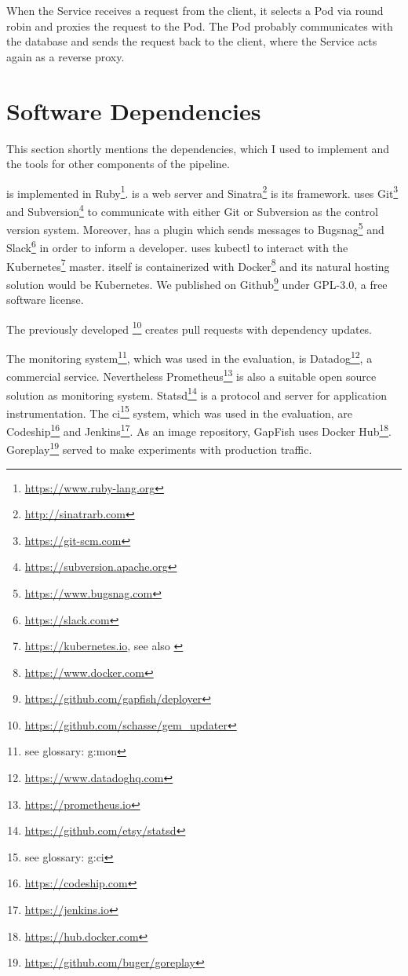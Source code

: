 When the Service receives a request from the client, it selects a Pod via round robin and
proxies the request to the Pod. The Pod probably communicates with the database and sends
the request back to the client, where the Service acts again as a reverse proxy.

\section{Software Dependencies}

This section shortly mentions the dependencies, which I used to implement \deployer{} and the
tools for other components of the pipeline.

\deployer{} is implemented in Ruby\footnote{\url{https://www.ruby-lang.org}}. \deployer{} is a
web server and Sinatra\footnote{\url{http://sinatrarb.com}} is its framework. \deployer{} uses
Git\footnote{\url{https://git-scm.com}} and
Subversion\footnote{\url{https://subversion.apache.org}} to communicate with either Git or
Subversion as the control version system. Moreover, \deployer{} has a plugin which sends
messages to Bugsnag\footnote{\url{https://www.bugsnag.com}} and
Slack\footnote{\url{https://slack.com}} in order to inform a developer. \deployer{} uses kubectl to interact with
the Kubernetes\footnote{\url{https://kubernetes.io}, see also
  \cite{kubernetes_architecture,kubernetes_architecture2}} master. \deployer{} itself is
containerized with Docker\footnote{\url{https://www.docker.com}} and its natural hosting
solution would be Kubernetes. We published \deployer{} on
Github\footnote{\url{https://github.com/gapfish/deployer}} under GPL-3.0, a free software
license.

The previously developed
\gemupdater{}\footnote{\url{https://github.com/schasse/gem_updater}} creates pull requests
with dependency updates.

The monitoring system\footnote{see glossary: \gls{g:mon}}, which was used in the evaluation,
is Datadog\footnote{\url{https://www.datadoghq.com}}, a commercial service. Nevertheless
Prometheus\footnote{\url{https://prometheus.io}} is also a suitable open source solution
as monitoring system. Statsd\footnote{\url{https://github.com/etsy/statsd}} is a protocol and server for application instrumentation. The \gls{ci}\footnote{see glossary: \gls{g:ci}} system, which was used in
the evaluation, are Codeship\footnote{\url{https://codeship.com}} and
Jenkins\footnote{\url{https://jenkins.io}}. As an image repository, GapFish uses Docker
Hub\footnote{\url{https://hub.docker.com}}. Goreplay\footnote{\url{https://github.com/buger/goreplay}}
served to make experiments with production traffic.

